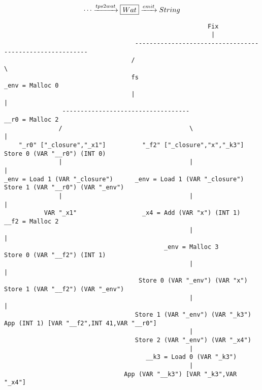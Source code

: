 \clearpage


\begin{landscape}
\begin{gather*}
  \cdots \xrightarrow{tps2wat} \boxed{Wat} \xrightarrow{emit} String
\end{gather*}
\begin{lstlisting}
                                                        Fix
                                                         |
                                    ---------------------------------------------------------
                                   /                                                         \
                                   fs                                                 _env = Malloc 0
                                   |                                                         |
                -----------------------------------                                   __r0 = Malloc 2
               /                                   \                                         |
    "_r0" ["_closure","_x1"]          "_f2" ["_closure","x","_k3"]              Store 0 (VAR "__r0") (INT 0)
               |                                   |                                         |
_env = Load 1 (VAR "_closure")      _env = Load 1 (VAR "_closure")           Store 1 (VAR "__r0") (VAR "_env")
               |                                   |                                         |
           VAR "_x1"                  _x4 = Add (VAR "x") (INT 1)                     __f2 = Malloc 2
                                                   |                                         |
                                            _env = Malloc 3                     Store 0 (VAR "__f2") (INT 1)
                                                   |                                         |
                                     Store 0 (VAR "_env") (VAR "x")          Store 1 (VAR "__f2") (VAR "_env")
                                                   |                                         |
                                    Store 1 (VAR "_env") (VAR "_k3")     App (INT 1) [VAR "__f2",INT 41,VAR "__r0"]
                                                   |
                                    Store 2 (VAR "_env") (VAR "_x4")
                                                   |
                                       __k3 = Load 0 (VAR "_k3")
                                                   |
                                 App (VAR "__k3") [VAR "_k3",VAR "_x4"]

\end{lstlisting}
\end{landscape}
\clearpage


